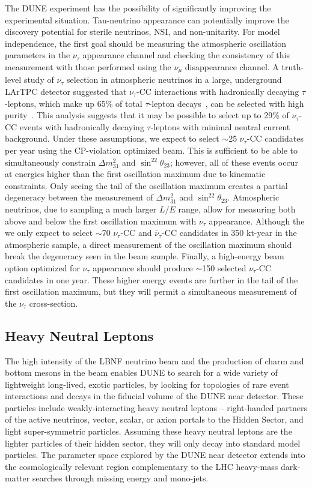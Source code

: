 The DUNE experiment has the possibility of significantly improving the experimental situation.  Tau-neutrino appearance can potentially improve the discovery potential for sterile neutrinos, NSI, and non-unitarity.  For model independence, the first goal should be measuring the atmospheric oscillation parameters in the $\nu_{\tau}$ appearance channel and checking the consistency of this measurement with those performed using the $\nu_{\mu}$ disappearance channel.  A truth-level study of $\nu_{\tau}$ selection in atmospheric neutrinos in a large, underground LArTPC detector suggested that $\nu_{\tau}$-CC interactions with hadronically decaying $\tau$-leptons, which make up 65\% of total $\tau$-lepton decays~\cite{PDG}, can be selected with high purity~\cite{Conrad:1008}.  This analysis suggests that it may be possible to select up to 29\% of $\nu_{\tau}$-CC events with hadronically decaying $\tau$-leptons with minimal neutral current background.  Under these assumptions, we expect to select $\sim$25 $\nu_{\tau}$-CC candidates per year using the CP-violation optimized beam.  This is sufficient to be able to simultaneously constrain $\Delta m^2_{31}$ and $\sin^22\theta_{23}$; however, all of these events occur at energies higher than the first oscillation maximum due to kinematic constraints.  Only seeing the tail of the oscillation maximum creates a partial degeneracy between the measurement of  $\Delta m^2_{31}$ and $\sin^22\theta_{23}$.  Atmospheric neutrinos, due to sampling a much larger $L/E$ range, allow for measuring both above and below the first oscillation maximum with $\nu_{\tau}$ appearance.  Although the we only expect to select $\sim$70 $\nu_{\tau}$-CC and $\bar{\nu}_{\tau}$-CC candidates in 350 kt-year in the atmospheric sample,  a direct measurement of the oscillation maximum should break the degeneracy seen in the beam sample.  Finally, a high-energy beam option optimized for $\nu_{\tau}$ appearance should produce $\sim$150 selected  $\nu_{\tau}$-CC candidates in one year.  These higher energy events are further in the tail of the first oscillation maximum, but they will permit a simultaneous measurement of the $\nu_{\tau}$ cross-section. 

\subsection{Heavy Neutral Leptons}
The high intensity of the LBNF neutrino beam and the production of charm and bottom mesons in the beam enables DUNE to search for a wide variety of lightweight long-lived, exotic particles, by looking for topologies of rare event interactions and decays in the fiducial volume of the DUNE near detector. These particles include weakly-interacting heavy neutral leptons – right-handed partners of the active neutrinos, vector, scalar, or axion portals to the Hidden Sector, and light super-symmetric particles. Assuming these heavy neutral leptons are the lighter particles of their hidden sector, they will only decay into standard model particles. The parameter space explored by the DUNE near detector extends into the cosmologically relevant region complementary to the LHC heavy-mass dark-matter searches through missing energy and mono-jets.

